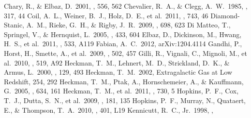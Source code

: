 \documentclass[apj]{emulateapj}
\begin{document}
\begin{thebibliography}{}
 Chary, R., \& Elbaz, D.\ 2001,
  \apj, 556, 562
 Chevalier, R.~A., \& Clegg,
  A.~W.\ 1985, \nat, 317, 44
 Coil, A.~L., Weiner, B.~J., Holz,
  D.~E., et al.\ 2011, \apj, 743, 46
 Diamond-Stanic, A.~M.,
  Rieke, G.~H., \& Rigby, J.~R.\ 2009, \apj, 698, 623
 Di Matteo, T., Springel, V.,
  \& Hernquist, L.\ 2005, \nat, 433, 604
 Elbaz, D., Dickinson, M., Hwang,
  H.~S., et al.\ 2011, \aap, 533, A119
 Fabian, A.~C.\ 2012,
  arXiv:1204.4114
 Gandhi, P., Horst, H., Smette,
  A., et al.\ 2009, \aap, 502, 457
 Gilli, R., Vignali, C., Mignoli,
  M., et al.\ 2010, \aap, 519, A92
 Heckman, T.~M., Lehnert, M.~D.,
  Strickland, D.~K., \& Armus, L.\ 2000, \apjs, 129, 493
 Heckman, T.~M.\ 2002, Extragalactic Gas
  at Low Redshift, 254, 292
 Heckman, T.~M., Ptak, A.,
  Hornschemeier, A., \& Kauffmann, G.\ 2005, \apj, 634, 161
 Heckman, T.~M., et al.\ 2011,
  \apj, 730, 5
 Hopkins, P.~F., Cox, T.~J.,
  Dutta, S.~N., et al.\ 2009, \apjs, 181, 135
 Hopkins, P.~F., Murray, N.,
  Quataert, E., \& Thompson, T.~A.\ 2010, \mnras, 401, L19
 Kennicutt, R.~C., Jr.\ 1998, \apj,

\end{thebibliography}
\end{document}
